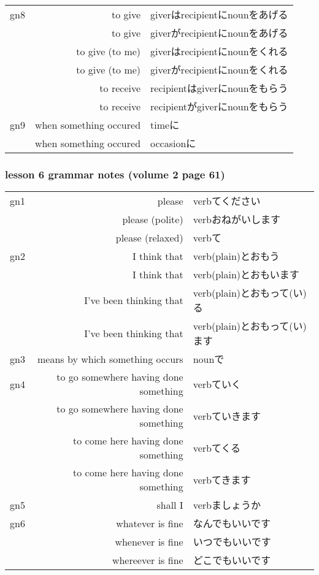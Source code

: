 \documentclass[14pt,onecolumn]{extarticle}
\begin{document}
\begin{CJK}{UTF8}{min}
\begin{tabular}{lrl}
gn8
&to give&giverはrecipientにnounをあげる\\
&to give&giverがrecipientにnounをあげる\\
&to give (to me)&giverはrecipientにnounをくれる\\
&to give (to me)&giverがrecipientにnounをくれる\\
&to receive&recipientはgiverにnounをもらう\\
&to receive&recipientがgiverにnounをもらう\\
\hline

gn9
&when something occured&timeに\\
&when something occured&occasionに\\

\end{tabular}

\subsubsection{lesson 6 grammar notes (volume 2 page 61)}
\begin{tabular}{lrl}

gn1
&please&verbてください\\
&please (polite)&verbおねがいします\\
&please (relaxed)&verbて\\
\hline

gn2
&I think that&verb(plain)とおもう\\
&I think that&verb(plain)とおもいます\\
&I've been thinking that&verb(plain)とおもって(い)る\\
&I've been thinking that&verb(plain)とおもって(い)ます\\
\hline

gn3
&means by which something occurs&nounで\\
\hline

gn4
&to go somewhere having done something&verbていく\\
&to go somewhere having done something&verbていきます\\
&to come here having done something&verbてくる\\
&to come here having done something&verbてきます\\
\hline

gn5
&shall I&verbましょうか\\
\hline

gn6
&whatever is fine&なんでもいいです\\
&whenever is fine&いつでもいいです\\
&whereever is fine&どこでもいいです\\
\hline


\end{tabular}
\end{CJK}
\end{document}
